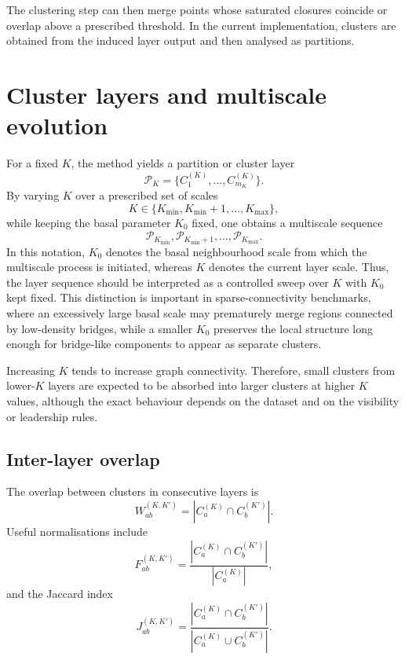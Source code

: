 \documentclass[pdflatex,sn-mathphys-num]{sn-jnl}
\newcommand{\calP}{\mathcal{P}}
\begin{document}
The clustering step can then merge points whose saturated closures coincide or overlap above a prescribed threshold. In the current implementation, clusters are obtained from the induced layer output and then analysed as partitions.

\section{Cluster layers and multiscale evolution}\label{sec:layers}

For a fixed $K$, the method yields a partition or cluster layer
\begin{equation}
\calP_K=\{C_1^{(K)},\ldots,C_{m_K}^{(K)}\}.
\end{equation}
By varying $K$ over a prescribed set of scales
\begin{equation}
K\in\{K_{\min},K_{\min}+1,\ldots,K_{\max}\},
\end{equation}
while keeping the basal parameter $K_0$ fixed, one obtains a multiscale sequence
\begin{equation}
\calP_{K_{\min}},\calP_{K_{\min}+1},\ldots,\calP_{K_{\max}}.
\end{equation}
In this notation, $K_0$ denotes the basal neighbourhood scale from which the multiscale process is initiated, whereas $K$ denotes the current layer scale. Thus, the layer sequence should be interpreted as a controlled sweep over $K$ with $K_0$ kept fixed. This distinction is important in sparse-connectivity benchmarks, where an excessively large basal scale may prematurely merge regions connected by low-density bridges, while a smaller $K_0$ preserves the local structure long enough for bridge-like components to appear as separate clusters.

Increasing $K$ tends to increase graph connectivity. Therefore, small clusters from lower-$K$ layers are expected to be absorbed into larger clusters at higher $K$ values, although the exact behaviour depends on the dataset and on the visibility or leadership rules.

\subsection{Inter-layer overlap}

The overlap between clusters in consecutive layers is
\begin{equation}
W_{ab}^{(K,K')}=|C_a^{(K)}\cap C_b^{(K')}|.
\label{eq:overlap_count}
\end{equation}
Useful normalisations include
\begin{equation}
F_{ab}^{(K,K')}=\frac{|C_a^{(K)}\cap C_b^{(K')}|}{|C_a^{(K)}|},
\label{eq:frac_from}
\end{equation}
and the Jaccard index
\begin{equation}
J_{ab}^{(K,K')}=\frac{|C_a^{(K)}\cap C_b^{(K')}|}{|C_a^{(K)}\cup C_b^{(K')}|}.
\label{eq:jaccard}
\end{equation}
\end{document}

